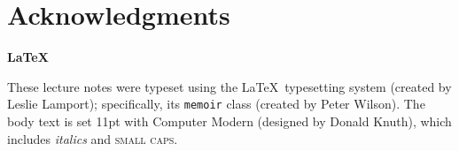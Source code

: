 \documentclass[11pt, a4paper, oneside]{memoir}
\begin{document}
\backmatter

\chapter{Acknowledgments}
\Blindtext






\clearpage
\thispagestyle{empty}
\vspace*{\fill}
\begin{center}
  \begin{minipage}{0.75\textwidth}
    \begin{center}
      {\LARGE \textbf{\LaTeX}}

      These lecture notes were typeset using the \LaTeX\ typesetting system
      (created by Leslie Lamport); specifically, its \texttt{memoir} class
      (created by Peter Wilson). The body text is set 11pt with Computer Modern
      (designed by Donald Knuth), which includes \textit{italics} and \textsc{small caps.}
    \end{center}
  \end{minipage}
\end{center}
\vfill
\end{document}
